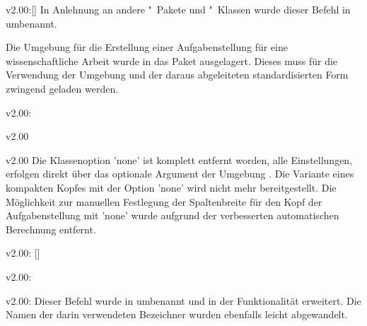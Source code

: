\begin{Cessation}{v2.00:}{[]}
\printobsoletelist%
%
In Anlehnung an andere "~Pakete und "~Klassen wurde 
dieser Befehl in  umbenannt.
\end{Cessation}

\minisec{\taskname}
\begin{Entity}{}
Die Umgebung für die Erstellung einer Aufgabenstellung für eine 
wissenschaftliche Arbeit wurde in das Paket  
ausgelagert. Dieses muss für die Verwendung der Umgebung  
und der daraus abgeleiteten standardisierten Form zwingend geladen werden.

\begin{Cessation}{v2.00:}{}
\begin{Cessation}{v2.00}{}
\begin{Cessation}{v2.00}{}
\printobsoletelist%
%
Die Klassenoption 'none' ist komplett entfernt worden, alle 
Einstellungen, erfolgen direkt über das optionale Argument der Umgebung 
. Die Variante eines kompakten Kopfes mit der Option 
'none' wird nicht mehr bereitgestellt. Die Möglichkeit zur 
manuellen Festlegung der Spaltenbreite für den Kopf der Aufgabenstellung mit 
'none' wurde aufgrund der verbesserten automatischen 
Berechnung entfernt.
\end{Cessation}
\end{Cessation}
\end{Cessation}

\begin{Cessation}{v2.00:}{%
  []%
}
\begin{Cessation}{v2.00:}{}
\begin{Cessation}{v2.00:}{}
\printobsoletelist%
%
Dieser Befehl wurde in  umbenannt und in der Funktionalität 
erweitert. Die Namen der darin verwendeten Bezeichner wurden ebenfalls leicht 
abgewandelt.
\end{Cessation}
\end{Cessation}
\end{Cessation}


\end{Entity}
